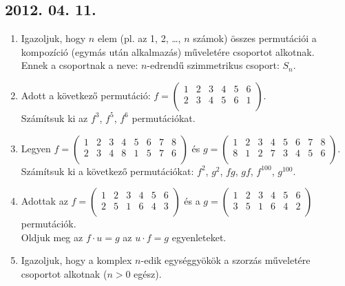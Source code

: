 \subsection*{2012. 04. 11.}
\begin{enumerate}
\item Igazoljuk, hogy $n$ elem (pl. az 1, 2, \ldots, $n$ számok) összes permutációi a kompozíció (egymás után alkalmazás) műveletére csoportot alkotnak.\\ Ennek a csoportnak a neve: $n$-edrendű szimmetrikus csoport: $S_n$.
\item Adott a következő permutáció: $f=\left(\begin{matrix}
1&2&3&4&5&6\\
2&3&4&5&6&1\\
\end{matrix}\right)$.\\
Számítsuk ki az $f^3$, $f^5$, $f^6$ permutációkat.
\item Legyen $f=\left(\begin{matrix}
1&2&3&4&5&6&7&8\\
2&3&4&8&1&5&7&6\\
\end{matrix}\right)$ és $g=\left(\begin{matrix}
1&2&3&4&5&6&7&8\\
8&1&2&7&3&4&5&6\\
\end{matrix}\right)$.\\ Számítsuk ki a következő permutációkat: $f^2$, $g^2$, $fg$, $gf$, $f^{100}$, $g^{100}$.
\item Adottak az $f=\left(\begin{matrix}
1&2&3&4&5&6\\
2&5&1&6&4&3\\
\end{matrix}\right)$ és a $g=\left(\begin{matrix}
1&2&3&4&5&6\\
3&5&1&6&4&2\\
\end{matrix}\right)$ permutációk.\\ Oldjuk meg az $f\cdot u=g$ az $u\cdot f=g$ egyenleteket.
\item Igazoljuk, hogy a komplex $n$-edik egységgyökök a szorzás műveletére csoportot alkotnak ($n>0$ egész).
\end{enumerate}

